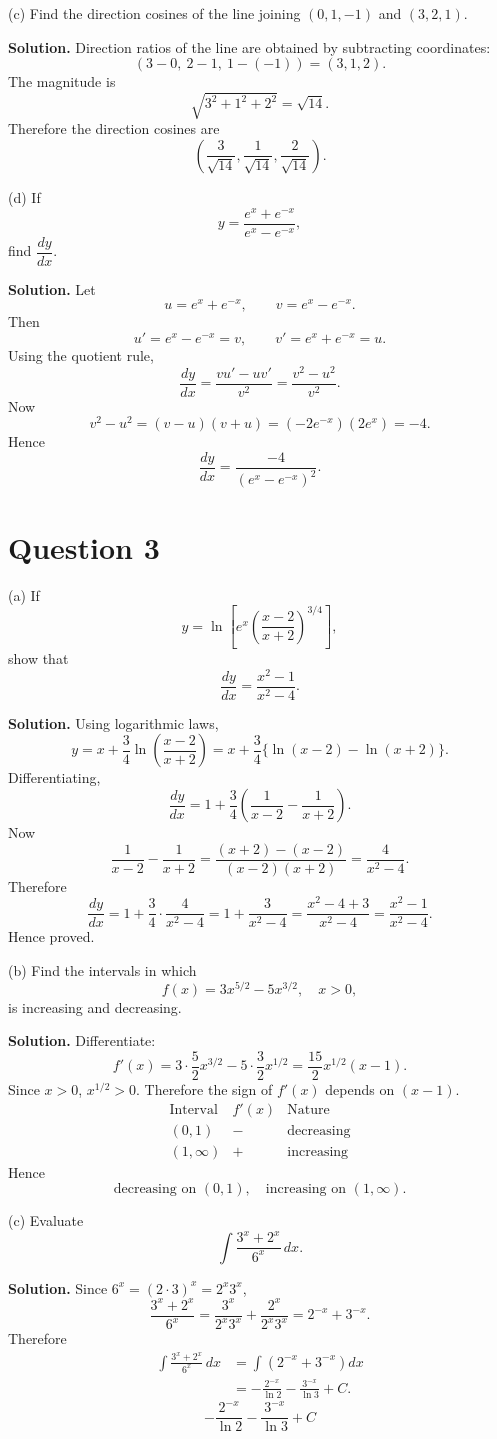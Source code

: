 \documentclass[11pt,a4paper]{article}
\newcommand{\question}[1]{\vspace{0.4em}\begin{tcolorbox}[colback=gray!8,colframe=black!55,title=Question,fonttitle=\bfseries]#1\end{tcolorbox}}
\newcommand{\answer}{\textbf{Solution. }}
\newcommand{\final}[1]{\[\boxed{#1}\]}
\begin{document}
\question{(c) Find the direction cosines of the line joining $(0,1,-1)$ and $(3,2,1)$.}
\answer
Direction ratios of the line are obtained by subtracting coordinates:
\[
(3-0,\ 2-1,\ 1-(-1))=(3,1,2).
\]
The magnitude is
\[
\sqrt{3^2+1^2+2^2}=\sqrt{14}.
\]
Therefore the direction cosines are
\[
\boxed{\left(\frac3{\sqrt{14}},\frac1{\sqrt{14}},\frac2{\sqrt{14}}\right)}.
\]

\question{(d) If
\[
y=\frac{e^x+e^{-x}}{e^x-e^{-x}},
\]
find $\dfrac{dy}{dx}$.}
\answer
Let
\[
u=e^x+e^{-x},\qquad v=e^x-e^{-x}.
\]
Then
\[
u'=e^x-e^{-x}=v,
\qquad
v'=e^x+e^{-x}=u.
\]
Using the quotient rule,
\[
\frac{dy}{dx}=\frac{v u'-u v'}{v^2}=\frac{v^2-u^2}{v^2}.
\]
Now
\[
v^2-u^2=(v-u)(v+u)=(-2e^{-x})(2e^x)=-4.
\]
Hence
\[
\boxed{\frac{dy}{dx}=\frac{-4}{(e^x-e^{-x})^2}}.
\]

\section*{Question 3}

\question{(a) If
\[
y=\ln\left[e^x\left(\frac{x-2}{x+2}\right)^{3/4}\right],
\]
show that
\[
\frac{dy}{dx}=\frac{x^2-1}{x^2-4}.
\]}
\answer
Using logarithmic laws,
\[
y=x+\frac34\ln\left(\frac{x-2}{x+2}\right)
=x+\frac34\{\ln(x-2)-\ln(x+2)\}.
\]
Differentiating,
\[
\frac{dy}{dx}=1+\frac34\left(\frac1{x-2}-\frac1{x+2}\right).
\]
Now
\[
\frac1{x-2}-\frac1{x+2}=\frac{(x+2)-(x-2)}{(x-2)(x+2)}=\frac4{x^2-4}.
\]
Therefore
\[
\frac{dy}{dx}=1+\frac34\cdot\frac4{x^2-4}=1+\frac3{x^2-4}
=\frac{x^2-4+3}{x^2-4}=\frac{x^2-1}{x^2-4}.
\]
Hence proved.

\question{(b) Find the intervals in which
\[
f(x)=3x^{5/2}-5x^{3/2},\quad x>0,
\]
is increasing and decreasing.}
\answer
Differentiate:
\[
f'(x)=3\cdot\frac52x^{3/2}-5\cdot\frac32x^{1/2}
=\frac{15}{2}x^{1/2}(x-1).
\]
Since $x>0$, $x^{1/2}>0$. Therefore the sign of $f'(x)$ depends on $(x-1)$.
\[
\begin{array}{c|c|c}
\text{Interval} & f'(x) & \text{Nature}\\\hline
(0,1)& - & \text{decreasing}\\
(1,\infty)& + & \text{increasing}
\end{array}
\]
Hence
\[
\boxed{\text{decreasing on }(0,1),\quad \text{increasing on }(1,\infty).}
\]

\question{(c) Evaluate
\[
\int \frac{3^x+2^x}{6^x}\,dx.
\]}
\answer
Since $6^x=(2\cdot3)^x=2^x3^x$,
\[
\frac{3^x+2^x}{6^x}=\frac{3^x}{2^x3^x}+\frac{2^x}{2^x3^x}=2^{-x}+3^{-x}.
\]
Therefore
\[
\begin{aligned}
\int \frac{3^x+2^x}{6^x}\,dx
&=\int (2^{-x}+3^{-x})dx\\
&=-\frac{2^{-x}}{\ln 2}-\frac{3^{-x}}{\ln 3}+C.
\end{aligned}
\]
\final{-\frac{2^{-x}}{\ln 2}-\frac{3^{-x}}{\ln 3}+C}
\end{document}
